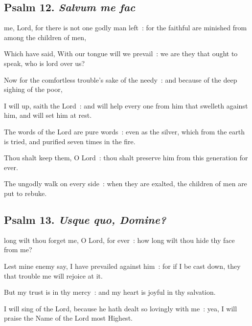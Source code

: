 \subsection{Psalm 12. \textit{Salvum me fac}}

 me, Lord, for there is not one godly man left~: for the faithful are minished from among the children of men,\par
{}
Which have said, With our tongue will we prevail~: we are they that ought to speak, who is lord over us?\par
{}Now for the comfortless trouble's sake of the needy~: and because of the deep sighing of the poor,\par
{}I will up, saith the Lord~: and will help every one from him that swelleth against him, and will set him at rest.\par
{}The words of the Lord are pure words~: even as the silver, which from the earth is tried, and purified seven times in the fire.\par
{}Thou shalt keep them, O Lord~: thou shalt preserve him from this generation for ever.\par
{}The ungodly walk on every side~: when they are exalted, the children of men are put to rebuke.\par

\clearpage
\subsection{Psalm 13. \textit{Usque quo, Domine?}}

 long wilt thou forget me, O Lord, for ever~: how long wilt thou hide thy face from me?\par
{}
Lest mine enemy say, I have prevailed against him~: for if I be cast down, they that trouble me will rejoice at it.\par
{}But my trust is in thy mercy~: and my heart is joyful in thy salvation.\par
{}I will sing of the Lord, because he hath dealt so lovingly with me~: yea, I will praise the Name of the Lord most Highest.\par


